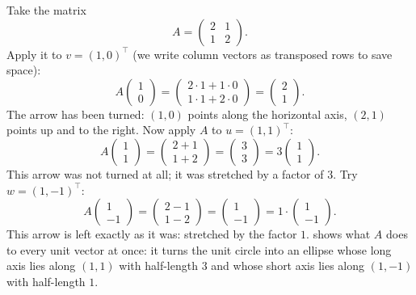 Take the matrix
\begin{equation}
A=\begin{pmatrix}2&1\\1&2\end{pmatrix}.
\label{eq:eigen-A21}
\end{equation}
Apply it to $v=(1,0)^\top$ (we write column vectors as transposed rows to save space):
\begin{equation}
A\begin{pmatrix}1\\0\end{pmatrix}=\begin{pmatrix}2\cdot1+1\cdot0\\1\cdot1+2\cdot0\end{pmatrix}=\begin{pmatrix}2\\1\end{pmatrix}.
\end{equation}
The arrow has been turned: $(1,0)$ points along the horizontal axis, $(2,1)$ points up and to the right. Now apply $A$ to $u=(1,1)^\top$:
\begin{equation}
A\begin{pmatrix}1\\1\end{pmatrix}=\begin{pmatrix}2+1\\1+2\end{pmatrix}=\begin{pmatrix}3\\3\end{pmatrix}=3\begin{pmatrix}1\\1\end{pmatrix}.
\end{equation}
This arrow was not turned at all; it was stretched by a factor of $3$. Try $w=(1,-1)^\top$:
\begin{equation}
A\begin{pmatrix}1\\-1\end{pmatrix}=\begin{pmatrix}2-1\\1-2\end{pmatrix}=\begin{pmatrix}1\\-1\end{pmatrix}=1\cdot\begin{pmatrix}1\\-1\end{pmatrix}.
\end{equation}
This arrow is left exactly as it was: stretched by the factor $1$.  shows what $A$ does to every unit vector at once: it turns the unit circle into an ellipse whose long axis lies along $(1,1)$ with half-length $3$ and whose short axis lies along $(1,-1)$ with half-length $1$.

